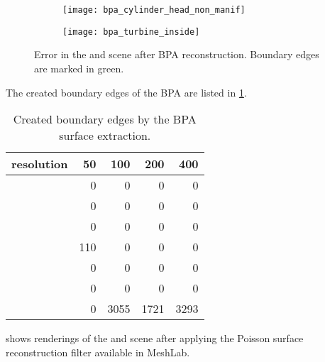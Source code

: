 \begin{figure}
	\centering
	\begin{subfigure}[b]{0.49\textwidth}
		\centering
		\texttt{[image: bpa\_cylinder\_head\_non\_manif]}
		\caption{}
		\label{fig:bpa_cylinder_head_non_manif}
	\end{subfigure}
	\begin{subfigure}[b]{0.49\textwidth}
		\centering
		\texttt{[image: bpa\_turbine\_inside]}
		\caption{}
		\label{fig:bpa_turbine_inside}
	\end{subfigure}
	\caption[BPA artifacts]{
		Error in the \cylinderhead and \turbine scene after BPA reconstruction.
		Boundary edges are marked in green.
	}
	\label{fig:bpa_issues}
\end{figure}

The created boundary edges of the BPA are listed in \cref{tbl:bpa_boundary edges}.

\begin{table}
	\centering
	\begin{tabular}{l|r|r|r|r}
		resolution    &  50 &  100 &  200 &  400 \\
		\midrule
		\cubes        &   0 &    0 &    0 &    0 \\
		\cylindersd   &   0 &    0 &    0 &    0 \\
		\cylinders    &   0 &    0 &    0 &    0 \\
		\cylinderhead & 110 &    0 &    0 &    0 \\
		\impeller     &   0 &    0 &    0 &    0 \\
		\impellerhalf &   0 &    0 &    0 &    0 \\
		\turbine      &   0 & 3055 & 1721 & 3293 \\
	\end{tabular}
	\caption[BPA boundary edges]{
		Created boundary edges by the BPA surface extraction.
	}
	\label{tbl:bpa_boundary edges}
\end{table}

 shows renderings of the \cylinderhead and \impeller scene after applying the Poisson surface reconstruction filter available in MeshLab.

